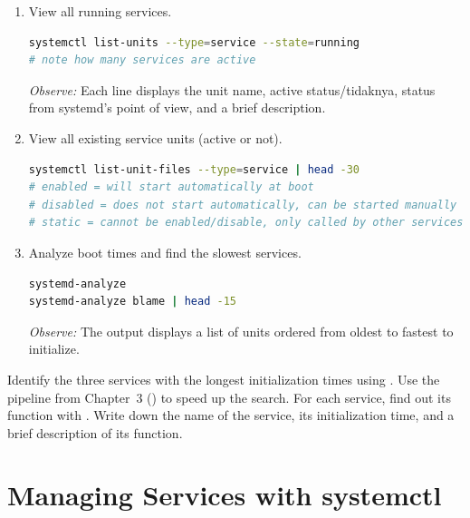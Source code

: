 \begin{enumerate}
\item View all running services.
\begin{lstlisting}[language=bash, caption={View active services}]
systemctl list-units --type=service --state=running
# note how many services are active
\end{lstlisting}

\textit{Observe:} Each line displays the unit name, active status/tidaknya, status from systemd's point of view, and a brief description.

\item View all existing service units (active or not).
\begin{lstlisting}[language=bash, caption={View All service Units}]
systemctl list-unit-files --type=service | head -30
# enabled = will start automatically at boot
# disabled = does not start automatically, can be started manually
# static = cannot be enabled/disable, only called by other services
\end{lstlisting}

\item Analyze boot times and find the slowest services.
\begin{lstlisting}[language=bash, caption={Boot time analysis}]
systemd-analyze
systemd-analyze blame | head -15
\end{lstlisting}

\textit{Observe:} The output  displays a list of units ordered from oldest to fastest to initialize.
\end{enumerate}

\begin{challengebox}
Identify the three services with the longest initialization times using . Use the pipeline from Chapter~3 () to speed up the search. For each service, find out its function with . Write down the name of the service, its initialization time, and a brief description of its function.
\end{challengebox}

\section{Managing Services with systemctl}
\label{sec:systemctl-services}

